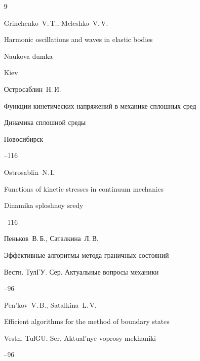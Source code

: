 \begin{thebibliography}{9}
\misctransl

\by Grinchenko~V.\,T., Meleshko~V.\,V.

\book Harmonic oscillations and waves in elastic bodies

\publ Naukova dumka

\publaddr Kiev








\by Остросаблин~Н.\,И.

\paper Функции кинетических напряжений в механике сплошных сред

\serial Динамика сплошной среды

\publaddr Новосибирск



--116

\misctransl

\by Ostrosablin~N.\,I. 

\paper Functions of kinetic stresses in continuum mechanics

\serial Dinamika sploshnoy sredy 



–116




\by Пеньков~В.\,Б., Саталкина~Л.\,В.

\paper Эффективные алгоритмы метода граничных состояний

\jour Вестн. ТулГУ. Сер. Актуальные вопросы механики



--96

\misctransl

\by Pen'kov~V.\,B., Satalkina~L.\,V.

\paper Efficient algorithms for the method of boundary states

\jour Vestn. TulGU. Ser. Aktual'nye voprosy mekhaniki



--96






\end{thebibliography}
